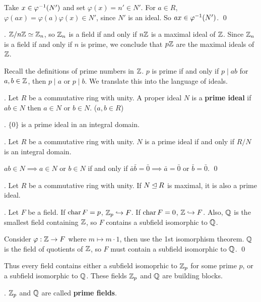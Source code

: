 \pf {} Take \(x \in \varphi^{-1}(N')\) and set \(\varphi(x) = n' \in N'\). For \(a \in R\), \(\varphi(ax) = \varphi(a)\varphi(x) \in N'\), since \(N'\) is an ideal. So \(ax \in \varphi^{-1}(N')\). \qed

\ex. \(\mathbb{Z}/n\mathbb{Z} \simeq \mathbb{Z}_n\), so \(\mathbb{Z}_n\) is a field if and only if \(n\mathbb{Z}\) is a maximal ideal of \(\mathbb{Z}\). Since \(\mathbb{Z}_n\) is a field if and only if \(n\) is prime, we conclude that \(p\mathbb{Z}\) are the maximal ideals of \(\mathbb{Z}\).

Recall the definitions of prime numbers in \(\mathbb{Z}\). \(p\) is prime if and only if \(p \mid ab\) for \(a, b \in \mathbb{Z}\), then \(p \mid a\) or \(p \mid b\). We translate this into the language of ideals.

.  Let \(R\) be a commutative ring with unity. A proper ideal \(N\) is a \textbf{prime ideal} if \(ab \in N\) then \(a \in N\) or \(b \in N\). (\(a, b \in R\))

\ex. \(\{0\}\) is a prime ideal in an integral domain.

\thm. Let \(R\) be a commutative ring with unity. \(N\) is a prime ideal if and only if \(R/N\) is an integral domain.

\pf \(ab \in N \implies a \in N\) or \(b \in N\) if and only if \(\bar{a}\bar{b} = \bar{0} \implies \bar{a} = \bar{0}\) or \(\bar{b} = \bar{0}\). \qed

\cor. Let \(R\) be a commutative ring with unity. If \(N \unlhd R\) is maximal, it is also a prime ideal.

\thm. Let \(F\) be a field. If \(\operatorname{char} F = p\), \(\mathbb{Z}_p \hookrightarrow F\). If \(\operatorname{char} F = 0\), \(\mathbb{Z} \hookrightarrow F\). Also, \(\mathbb{Q}\) is the smallest field containing \(\mathbb{Z}\), so \(F\) contains a subfield isomorphic to \(\mathbb{Q}\).

\begin{center}
\end{center}

\pf Consider \(\varphi: \mathbb{Z} \rightarrow F\) where \(m \mapsto m \cdot 1\), then use the 1st isomorphism theorem. \(\mathbb{Q}\) is the field of quotients of \(\mathbb{Z}\), so \(F\) must contain a subfield isomorphic to \(\mathbb{Q}\). \qed

Thus every field contains either a subfield isomoprhic to \(\mathbb{Z}_p\) for some prime \(p\), or a subfield isomorphic to \(\mathbb{Q}\). These fields \(\mathbb{Z}_p\) and \(\mathbb{Q}\) are building blocks.

. \(\mathbb{Z}_p\) and \(\mathbb{Q}\) are called \textbf{prime fields}.

\smallskip
